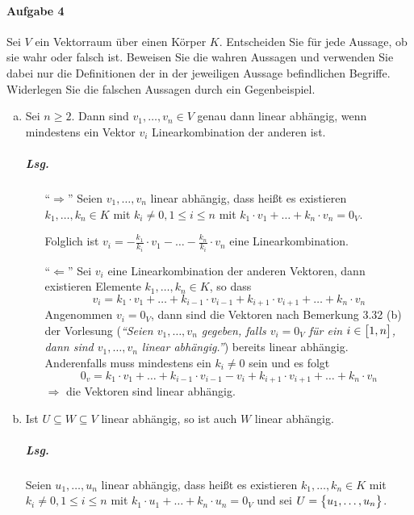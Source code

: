 \documentclass{scrreprt}
\begin{document}
\paragraph{Aufgabe 4} Sei $V$ ein Vektorraum über einen Körper $K$.
Entscheiden Sie für jede Aussage, ob sie wahr oder falsch ist.
Beweisen Sie die wahren Aussagen und verwenden Sie dabei nur die Definitionen
der in der jeweiligen Aussage befindlichen Begriffe.
Widerlegen Sie die falschen Aussagen durch ein Gegenbeispiel.
\begin{enumerate}[(a)]
\item Sei $n \geq 2$.
  Dann sind $v_1, \ldots, v_n \in V$ genau dann linear abhängig, wenn mindestens
  ein Vektor $v_i$ Linearkombination der anderen ist.

  \subparagraph{Lsg.}
  \begin{itemize}
  \item[``$\Rightarrow$''] Seien $v_1, \ldots, v_n$ linear abhängig, dass heißt
    es existieren $k_1, \ldots, k_n \in K$ mit $k_i \ne 0, 1 \leq i \leq n$
    mit $k_1 \cdot v_1 + \ldots + k_n \cdot v_n = 0_V$.

    Folglich ist
    $v_i = -\frac{k_1}{k_i} \cdot v_1 - \ldots - \frac{k_n}{k_i} \cdot v_n$
    eine Linearkombination.

  \item[``$\Leftarrow$''] Sei $v_i$ eine Linearkombination der anderen Vektoren,
    dann existieren Elemente $k_1, \ldots, k_n \in K$, so dass
    \[
      v_i = k_1 \cdot v_1 + \ldots + k_{i - 1} \cdot v_{i - 1} +
      k_{i + 1} \cdot v_{i + 1} + \ldots + k_n \cdot v_n
    \]
    Angenommen $v_i = 0_V$, dann sind die Vektoren nach Bemerkung 3.32 (b) der
    Vorlesung (\emph{``Seien $v_1, \ldots, v_n$ gegeben, falls $v_i = 0_V$ für
      ein $i \in \qty\big[1, n]$, dann sind $v_1, \ldots, v_n$ linear
      abhängig.''}) bereits linear abhängig.
    Anderenfalls muss mindestens ein $k_i \ne 0$ sein und es folgt
    \[
      0_v = k_1 \cdot v_1 + \ldots + k_{i - 1} \cdot v_{i - 1} - v_i +
      k_{i + 1} \cdot v_{i + 1} + \ldots + k_n \cdot v_n
    \]
    $\Rightarrow$ die Vektoren sind linear abhängig.
  \end{itemize}

\item Ist $U \subseteq W \subseteq V$ linear abhängig, so ist auch $W$ linear
  abhängig.

  \subparagraph{Lsg.} Seien $u_1, \ldots, u_n$ linear abhängig, dass heißt
  es existieren $k_1, \ldots, k_n \in K$ mit $k_i \ne 0, 1 \leq i \leq n$
  mit $k_1 \cdot u_1 + \ldots + k_n \cdot u_n = 0_V$ und sei
  $U = \qty\big{u_1, \ldots, u_n}$.


\end{enumerate}
\end{document}
